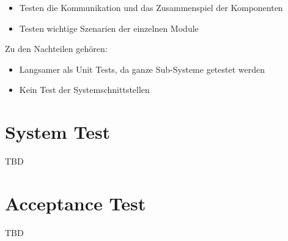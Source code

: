 \documentclass[a4paper,bibtotoc,oneside]{scrbook}
\begin{document}
\begin{itemize}
  \item Testen die Kommunikation und das Zusammenspiel der Komponenten
  \item Testen wichtige Szenarien der einzelnen Module
\end{itemize}

Zu den Nachteilen gehören:

\begin{itemize}
  \item Langsamer als Unit Tests, da ganze Sub-Systeme getestet werden
  \item Kein Test der Systemschnittstellen
\end{itemize}


\chapter{System Test}
TBD
% 

%



\chapter{Acceptance Test}
TBD


%
%
\end{document}
